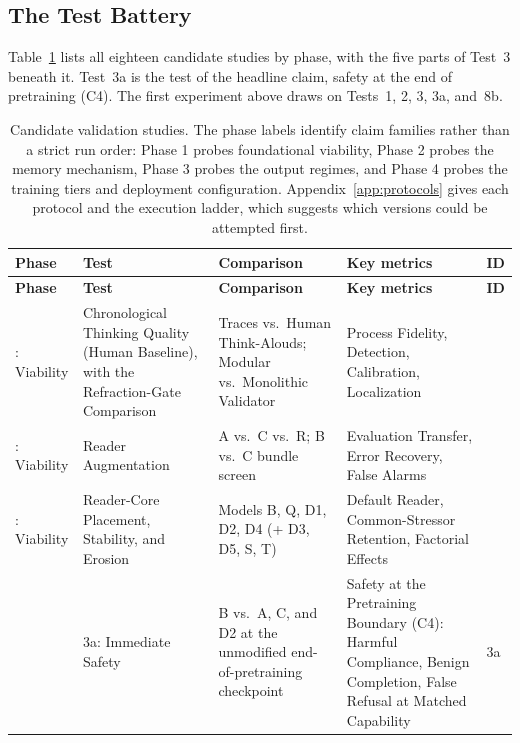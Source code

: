 \documentclass[11pt]{article}
\begin{document}
\subsection{The Test Battery}\label{sec:test-battery}

Table~\ref{tab:test-battery} lists all eighteen candidate studies by phase,
with the five parts of Test~3 beneath it. Test~3a is the test of the headline
claim, safety at the end of pretraining (C4). The first experiment above draws
on Tests~1, 2, 3, 3a, and~8b.

\begingroup
\footnotesize
\setlength{\tabcolsep}{3pt}
\begin{longtable}{
  >{\raggedright\arraybackslash}p{1.4cm}
  >{\raggedright\arraybackslash}p{3.2cm}
  >{\raggedright\arraybackslash}p{4.1cm}
  >{\raggedright\arraybackslash}p{5.3cm}
  >{\centering\arraybackslash}p{0.55cm}}
\caption{Candidate validation studies. The phase labels identify claim families rather than a strict run order: Phase 1 probes foundational viability, Phase 2 probes the memory mechanism, Phase 3 probes the output regimes, and Phase 4 probes the training tiers and deployment configuration. Appendix~\ref{app:protocols} gives each protocol and the execution ladder, which suggests which versions could be attempted first.}
\label{tab:test-battery}\\
\toprule
\textbf{Phase} & \textbf{Test} & \textbf{Comparison} & \textbf{Key metrics} & \textbf{ID} \\
\midrule
\endfirsthead
\toprule
\textbf{Phase} & \textbf{Test} & \textbf{Comparison} & \textbf{Key metrics} & \textbf{ID} \\
\midrule
\endhead
\bottomrule
\endlastfoot
1: Viability & Chronological Thinking Quality (Human Baseline), with the Refraction-Gate Comparison & Traces vs.\ Human Think-Alouds; Modular vs.\ Monolithic Validator & Process Fidelity, Detection, Calibration, Localization & 1 \\
1: Viability & Reader Augmentation & A vs.\ C vs.\ R; B vs.\ C bundle screen & Evaluation Transfer, Error Recovery, False Alarms & 2 \\
1: Viability & Reader-Core Placement, Stability, and Erosion & Models B, Q, D1, D2, D4 (+ D3, D5, S, T) & Default Reader, Common-Stressor Retention, Factorial Effects & 3 \\
 & \quad 3a: Immediate Safety & B vs.\ A, C, and D2 at the unmodified end-of-pretraining checkpoint & Safety at the Pretraining Boundary (C4): Harmful Compliance, Benign Completion, False Refusal at Matched Capability & 3a \\

\end{longtable}
\end{document}
